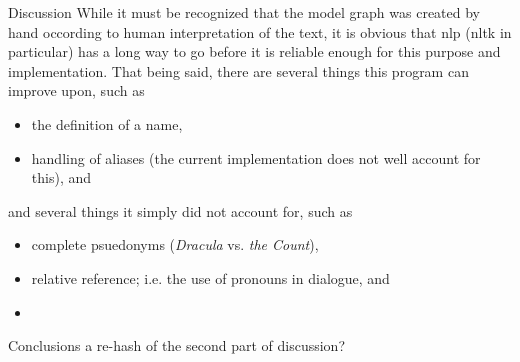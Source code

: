 \documentclass{beamer}
\begin{document}
\begin{frame}[t,fragile]{}
\begin{columns}
\begin{column}{.45\textwidth}
\begin{block}{Discussion}
        While it must be recognized that the model graph was created
        by hand occording to human interpretation of the text, it is
        obvious that \ac{nlp} (\ac{nltk} in particular) has a long way
        to go before it is reliable enough for this purpose and
        implementation.  That being said, there are several things
        this program can improve upon, such as
        \begin{itemize}
          \addtolength{\itemsep}{1ex}
        \item the definition of a name,
        \item handling of aliases (the current implementation does not well account for this), and 
        \end{itemize}
        and several things it simply did not account for, such as
        \begin{itemize}
          \addtolength{\itemsep}{1ex}
        \item complete psuedonyms (\textsl{Dracula} vs. \textsl{the Count}),
        \item relative reference; i.e. the use of pronouns in dialogue, and
        \item 
        \end{itemize}
      \end{block}

      \begin{block}{Conclusions}
        a re-hash of the second part of discussion?
      \end{block}

    \end{column}
  \end{columns}
\end{frame}
\end{document}
